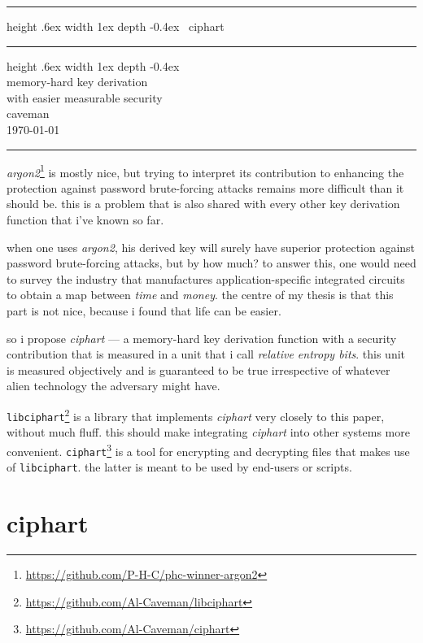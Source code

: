 \documentclass[twocolumn]{article}
\makeatletter
\def\myrulefill{%
    \leavevmode\leaders\hrule%
    height .6ex width 1ex depth -0.4ex%
    \hfill\kern\z@%
}
\makeatother
\begin{document}

\begin{center}
\Huge
\myrulefill\ ciphart \myrulefill\\
\LARGE
memory-hard key derivation \\
with easier measurable security\\
\normalsize
caveman\\
\today\\
\rule{1\columnwidth}{2pt}
\end{center}

\emph{argon2}\footnote{\url{https://github.com/P-H-C/phc-winner-argon2}}
is mostly nice, but trying to interpret its contribution to enhancing the
protection against password brute-forcing attacks remains more difficult
than it should be.  this is a problem that is also shared with every other
key derivation function that i've known so far.

when one uses \emph{argon2}, his derived key will surely have superior
protection against password brute-forcing attacks, but by how much?  to
answer this, one would need to survey the industry that manufactures
application-specific integrated circuits to obtain a map between
\emph{time} and \emph{money}.  the centre of my thesis is that this part is
not nice, because i found that life can be easier.

so i propose \emph{ciphart} --- a memory-hard key derivation function with
a security contribution that is measured in a unit that i call
\emph{relative entropy bits}.  this unit is measured objectively and is
guaranteed to be true irrespective of whatever alien technology the
adversary might have.

\texttt{libciphart}\footnote{\url{https://github.com/Al-Caveman/libciphart}}
is a library that implements \emph{ciphart} very closely to this paper,
without much fluff.  this should make integrating \emph{ciphart} into other
systems more convenient.
\texttt{ciphart}\footnote{\url{https://github.com/Al-Caveman/ciphart}} is a
tool for encrypting and decrypting files that makes use of
\texttt{libciphart}.  the latter is meant to be used by end-users or
scripts.

\tableofcontents
\vfill
\break

\section{ciphart}
\end{document}
